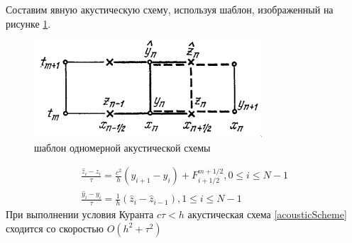 \documentclass[a4paper, fontsize=14pt]{article}
\begin{document}
Составим явную акустическую схему, используя шаблон, изображенный на рисунке \ref{acousticTpl}.
\begin{figure}[h]
    \centering
    \includegraphics{scheme1d}
    \caption{шаблон одномерной акустической схемы}
    \label{acousticTpl}
\end{figure}
\begin{equation}
    \label{acousticScheme}
    \begin{gathered}
        \frac{\hat{z}_i - z_i}{\tau}=\frac{c^2}{h} (y_{i+1} - y_{i}) + F^{m+1/2}_{i+1/2}, 0\leq i\leq N-1\\
        \frac{\hat{y}_i - y_i}{\tau}=\frac{1}{h}(\hat{z}_i - \hat{z}_{i-1}), 1 \leq i \leq N-1
    \end{gathered}
\end{equation}
При выполнении условия Куранта $c\tau<h$ акустическая схема \ref{acousticScheme} сходится со
скоростью $O(h^2+\tau^2)$  \cite{kal}
\end{document}

